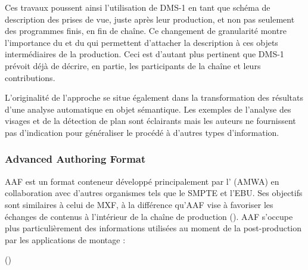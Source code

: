 Ces travaux poussent ainsi l'utilisation de DMS-1 en tant que schéma de description des prises de vue, juste après leur production, et non pas seulement des programmes finis, en fin de chaîne. 
Ce changement de granularité montre l'importance du  et du  qui permettent d'attacher la description à ces objets intermédiaires de la production.
Ceci est d'autant plus pertinent que DMS-1 prévoit déjà de décrire, en partie, les participants de la chaîne et leurs contributions.

L'originalité de l'approche se situe également dans la transformation des résultats d'une analyse automatique en objet sémantique. 
Les exemples de l'analyse des visages et de la détection de plan sont éclairants mais les auteurs ne fournissent pas d'indication pour généraliser le procédé à d'autres types d'information.



\subsubsection{Advanced Authoring Format}
AAF est un format conteneur développé principalement par l' (AMWA) en collaboration avec d'autres organismes tels que le SMPTE et l'EBU.
Ses objectifs sont similaires à celui de MXF, à la différence qu'AAF vise à favoriser les échanges de contenus à l'intérieur de la chaîne de production (\cite{Austerberry2004}).
AAF s'occupe plus particulièrement des informations utilisées au moment de la post-production par les applications de montage : 

 (\cite{Gilmer2002})

